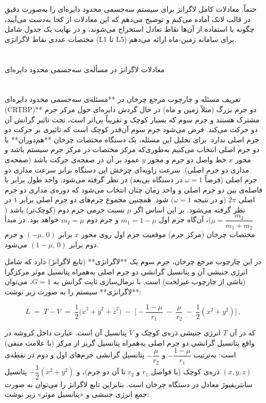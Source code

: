 حتماً. معادلات کامل لاگرانژ برای سیستم سه‌جسمی محدود دایره‌ای را به‌صورت دقیق در قالب لاتک آماده می‌کنم و توضیح می‌دهم که این معادلات از کجا به‌دست می‌آیند، چگونه با استفاده از آن‌ها نقاط تعادل استخراج می‌شوند، و در نهایت یک جدول شامل مختصات عددی نقاط لاگرانژی (L1 تا L5) برای سامانه زمین-ماه ارائه می‌دهم.

\section{} معادلات لاگرانژ در مسأله‌ی سه‌جسمی محدود دایره‌ای

\section{} تعریف مسئله و چارچوب مرجع چرخان  
در **مسئله‌ی سه‌جسمی محدود دایره‌ای (CRTBP)** دو جرم بزرگ (مثلاً زمین و ماه) در حال گردش دایره‌ای حول مرکز جرم مشترک هستند و جرم سوم که بسیار کوچک و تقریباً بی‌اثر است، تحت تاثیر گرانش آن دو حرکت می‌کند. فرض می‌شود جرم سوم آن‌قدر کوچک است که تاثیری بر حرکت دو جرم اصلی ندارد. برای تحلیل این مسئله، یک دستگاه مختصات چرخان **هم‌دوران** با دو جرم اصلی انتخاب می‌کنیم به‌طوری‌که مرکز مختصات در مرکز جرم سیستم باشد و محور $x$ خط واصل دو جرم و محور $y$ عمود بر آن در صفحه‌ی حرکت باشد (صفحه‌ی مداری دو جرم اصلی). سرعت زاویه‌ای چرخش این دستگاه برابر سرعت مداری دو جرم اصلی (فرضاً $\omega=1$ در دستگاه بی‌بعد) در نظر گرفته می‌شود. واحد طول برابر با فاصله‌ی بین دو جرم اصلی و واحد زمان چنان انتخاب می‌شود که دوره‌ی مداری دو جرم اصلی $2\pi$ (و در نتیجه $\omega=1$) شود. همچنین مجموع جرم‌های دو جرم اصلی برابر ۱ در نظر گرفته می‌شود. بر این اساس اگر $\mu$ نسبت جرمی جرم دوم (کوچک‌تر) باشد ($\mu=\dfrac{m_2}{m_1+m_2}$)، آن‌گاه جرم اول $m_1=1-\mu$ و جرم دوم $m_2=\mu$ خواهد بود. در مبدأ مختصات چرخان (مرکز جرم) موقعیت جرم اول روی محور $x$ برابر $(-\mu,\,0)$ و جرم دوم برابر $(1-\mu,\,0)$ می‌شود.  

در این چارچوب مرجع چرخان، جرم سوم یک **لاگرانژی** (تابع لاگرانژ) دارد که شامل انرژی جنبشی آن و پتانسیل گرانشی دو جرم اصلی به‌همراه پتانسیل موثر مرکزگرا (ناشی از چارچوب غیرلخت) است. با نرمال‌سازی ثابت گرانش به $G=1$، می‌توان **لاگرانژی** سیستم را به صورت زیر نوشت:

$$ 
L \;=\; T - V \;=\; \dfrac{1}{2}\Big(\dot{x}^2+\dot{y}^2+\dot{z}^2\Big)\;-\;\Bigg[-\dfrac{1-\mu}{r_1}\;-\;\dfrac{\mu}{r_2}\;-\;\dfrac{1}{2}(x^2+y^2)\Bigg]~, 
$$

که در آن $T$ انرژی جنبشی ذره‌ی کوچک و $V$ پتانسیل آن است. عبارت داخل کروشه در واقع پتانسیل گرانشی دو جرم اصلی به‌همراه پتانسیل گریز از مرکز (با علامت منفی) است: به‌ترتیب $-\dfrac{1-\mu}{r_1}$ و $-\dfrac{\mu}{r_2}$ پتانسیل گرانشی جرم‌های اول و دوم در نقطه‌ی $(x,y,z)$ ذره‌ی کوچک (با فواصل $r_1$ و $r_2$ تا آن دو جرم)، و $-\dfrac{1}{2}(x^2+y^2)$ پتانسیل سانتریفیوژ معادل در دستگاه چرخان است. بنابراین تابع لاگرانژ را می‌توان به صورت جمع انرژی جنبشی و «پتانسیل موثر» زیر نوشت:

